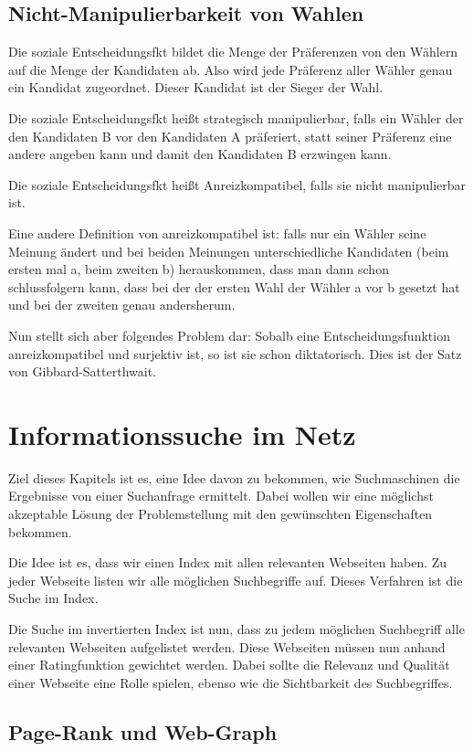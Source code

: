 \documentclass[]{article}
\begin{document}
\subsection{Nicht-Manipulierbarkeit von Wahlen}

 Die soziale Entscheidungsfkt bildet die Menge der Präferenzen von den Wählern auf die Menge der Kandidaten ab. Also wird jede Präferenz aller Wähler genau ein Kandidat zugeordnet. Dieser Kandidat ist der Sieger der Wahl.
 
 Die soziale Entscheidungsfkt heißt strategisch manipulierbar, falls ein Wähler der den Kandidaten B vor den Kandidaten A präferiert, statt seiner Präferenz eine andere angeben kann und damit den Kandidaten B erzwingen kann. 
 
 Die soziale Entscheidungsfkt heißt Anreizkompatibel, falls sie nicht manipulierbar ist. 
 
Eine andere Definition von anreizkompatibel ist: falls nur ein Wähler seine Meinung ändert und bei beiden Meinungen unterschiedliche Kandidaten (beim ersten mal a, beim zweiten b) herauskommen, dass man dann schon schlussfolgern kann, dass bei der der ersten Wahl der Wähler a vor b gesetzt hat und bei der zweiten genau andersherum. 

Nun stellt sich aber folgendes Problem dar: Sobalb eine Entscheidungsfunktion anreizkompatibel und surjektiv ist, so ist sie schon diktatorisch. Dies ist der Satz von Gibbard-Satterthwait. 
 
\section{Informationssuche im Netz}
Ziel dieses Kapitels ist es, eine Idee davon zu bekommen, wie Suchmaschinen die Ergebnisse von einer Suchanfrage ermittelt. Dabei wollen wir eine möglichst akzeptable Lösung der Problemstellung mit den gewünschten Eigenschaften bekommen. 

Die Idee ist es, dass wir einen Index mit allen relevanten Webseiten haben. Zu jeder Webseite listen wir alle möglichen Suchbegriffe auf. Dieses Verfahren ist die Suche im Index.

Die Suche im invertierten Index ist nun, dass zu jedem möglichen Suchbegriff alle relevanten Webseiten aufgelistet werden. Diese Webseiten müssen nun anhand einer Ratingfunktion gewichtet werden. Dabei sollte die Relevanz und Qualität einer Webseite eine Rolle spielen, ebenso wie die Sichtbarkeit des Suchbegriffes. 

\subsection{Page-Rank und Web-Graph}
\end{document}
